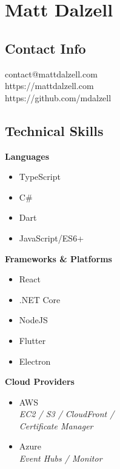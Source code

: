 \documentclass[11pt]{article}
\begin{document}

\section*{Matt Dalzell}

\setlength{\columnsep}{4em}
\setlength{\columnseprule}{0.1pt}
\begin{paracol}{2}

\subsection*{Contact Info}
contact@mattdalzell.com \\ 
https://mattdalzell.com \\
https://github.com/mdalzell 

\subsection*{Technical Skills} 

\textbf{Languages}
\begin{itemize}
    \item TypeScript
    \item C\#
    \item Dart
    \item JavaScript/ES6+
\end{itemize}

\noindent \textbf{Frameworks \& Platforms}
\begin{itemize}
    \item React
    \item .NET Core
    \item NodeJS
    \item Flutter
    \item Electron
\end{itemize}

\noindent \textbf{Cloud Providers}
\begin{itemize}
    \item AWS  \\ {\footnotesize{\textit{EC2 / S3 / CloudFront / \\ Certificate Manager}}}
    \item Azure \\ {\footnotesize{\textit{Event Hubs / Monitor}}}
\end{itemize}


\end{paracol}
\end{document}
